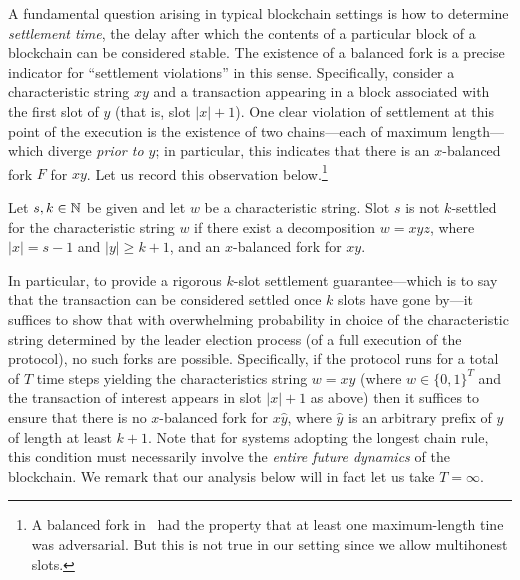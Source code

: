A fundamental question arising in typical blockchain settings is how
to determine \emph{settlement time}, the delay after which the
contents of a particular block of a blockchain can be considered
stable. The existence of a balanced fork is a precise indicator for
``settlement violations'' in this sense. Specifically, consider a
characteristic string $xy$ and a transaction appearing in a block
associated with the first slot of $y$ (that is, slot $|x| + 1$). One
clear violation of settlement at this point of the execution is the
existence of two chains---each of maximum length---which diverge
\emph{prior to $y$}; in particular, this indicates that there is an
$x$-balanced fork $F$ for $xy$. Let us record this observation below.\footnote{
  A balanced fork in~\cite{LinearConsistency} 
  had the property that 
  at least one maximum-length tine was adversarial. 
  But this is not true in our setting since we allow multihonest slots.
}


\begin{observation}\label{obs:settlement-balanced-fork-mh}
  Let $s, k \in \mathbb{N}$ be given and 
  let $w$ be a characteristic string. 
  Slot $s$ is not $k$-settled for the characteristic string $w$ 
  if 
  there exist a decomposition $w = xyz$, 
  where $|x| = s - 1$ and $|y| \geq k+1$, 
  and an $x$-balanced fork for $xy$. 
\end{observation}

In particular, to provide a rigorous $k$-slot settlement
guarantee---which is to say that the transaction can be considered
settled once $k$ slots have gone by---it suffices to show that with
overwhelming probability in choice of the characteristic string
determined by the leader election process (of a full execution of the
protocol), no such forks are possible. Specifically, if the protocol
runs for a total of $T$ time steps yielding the characteristics string
$w = xy$ (where $w \in \{0,1\}^T$ and the transaction of interest
appears in slot $|x| + 1$ as above) then it suffices to ensure that
there is no $x$-balanced fork for $x\hat{y}$, where $\hat{y}$ is an
arbitrary prefix of $y$ of length at least $k + 1$. 
Note that
for systems adopting the longest chain rule, this condition must
necessarily involve the \emph{entire future dynamics} of the
blockchain. We remark that our analysis below will in fact let us take
$T = \infty$.


